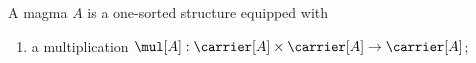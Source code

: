 
\begin{struct}\label{style_magma}
    A magma $A$ is a one-sorted structure equipped with
    \begin{enumerate}
        \item\label{style_magma_multiplication}
            a multiplication
            $\mul[A]:\carrier[A]\times\carrier[A]\to\carrier[A]$;
    \end{enumerate}
\end{struct}
